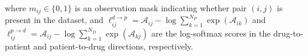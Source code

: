 \documentclass[sigconf,authordraft]{acmart}
\begin{document}
\noindent where $m_{ij} \in \{0,1\}$ is an observation mask indicating whether pair $(i,j)$ is present in the dataset, and $\ell_{ij}^{d\to p} = \mathcal{A}_{ij} - \log\sum_{k=1}^{N_P}\exp(\mathcal{A}_{ik})$ and $\ell_{ij}^{p\to d} = \mathcal{A}_{ij} - \log\sum_{k=1}^{N_D}\exp(\mathcal{A}_{kj})$ are the log-softmax scores in the drug-to-patient and patient-to-drug directions, respectively. 


\end{document}
